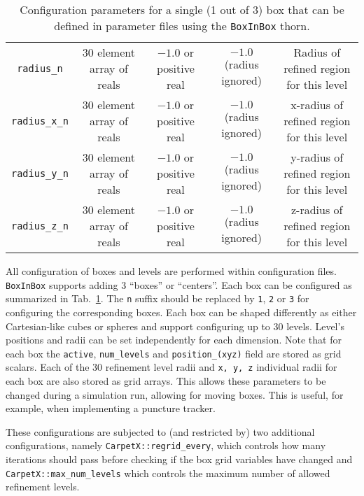 \begin{table}[]
{\begin{tabular}{ccccc}
    \texttt{radius\_n}      & 30 element array of reals & $-1.0$ or positive real                                           & $-1.0$ (radius ignored)         & Radius of refined region for this level   \\
    \texttt{radius\_x\_n}   & 30 element array of reals & $-1.0$ or positive real                                           & $-1.0$ (radius ignored)         & x-radius of refined region for this level \\
    \texttt{radius\_y\_n}   & 30 element array of reals & $-1.0$ or positive real                                           & $-1.0$ (radius ignored)         & y-radius of refined region for this level \\
    \texttt{radius\_z\_n}   & 30 element array of reals & $-1.0$ or positive real                                           & $-1.0$ (radius ignored)         & z-radius of refined region for this level \\\hline\hline
  \end{tabular}%
  }
  \caption{Configuration parameters for a single (1 out of 3) box that can be defined in parameter files using the \texttt{BoxInBox} thorn.}
  \label{tab:box_config}
\end{table}

All configuration of boxes and levels are performed within configuration files. \texttt{BoxInBox} supports adding 3 ``boxes'' or ``centers''. Each box can be configured as summarized in Tab.~\ref{tab:box_config}. The \texttt{n} suffix should be replaced by \texttt{1}, \texttt{2} or \texttt{3} for configuring the corresponding boxes. Each box can be shaped differently as either Cartesian-like cubes or spheres and support configuring up to 30 levels. Level's positions and radii can be set independently for each dimension. Note that for each box the \texttt{active}, \texttt{num\_levels} and \texttt{position\_(xyz)} field are stored as grid scalars. Each of the 30 refinement level radii and \texttt{x, y, z} individual radii for each box are also stored as grid arrays. This allows these parameters to be changed during a simulation run, allowing for moving boxes. This is useful, for example, when implementing a puncture tracker. 

These configurations are subjected to (and restricted by) two additional \CarpetX\space configurations, namely \texttt{CarpetX::regrid\_every}, which controls how many iterations should pass before checking if the box grid variables have changed and \texttt{CarpetX::max\_num\_levels} which controls the maximum number of allowed refinement levels.

